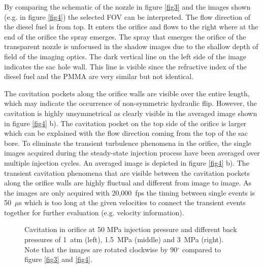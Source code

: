 \documentclass[letterpaper,twocolumn,10pt]{ilass}
\begin{document}
By comparing the schematic of the nozzle in figure \ref{fig3} and the images shown
(e.g. in figure \ref{fig4}) the selected FOV can be interpreted. The flow direction of the
diesel fuel is from top. It enters the orifice and flows to the right where at the end of the
orifice the spray emerges.\newline
The spray that emerges the orifice of the transparent nozzle is unfocused in the shadow images
due to the shallow depth of field of the imaging optics. The dark vertical line on the left side of the image indicates the sac hole wall.
This line is visible since the refractive index of the diesel fuel and the PMMA are
very similar but not identical.


The cavitation pockets along the orifice walls are visible over the entire length,
which may indicate the occurrence of non-symmetric hydraulic flip.
However, the cavitation is highly unsymmetrical as clearly visible in the averaged image shown
in figure \ref{fig4} b). The cavitation pocket on the top side of the orifice is larger which
can be explained with the flow direction coming from the top of the sac bore.\newline
To eliminate the transient turbulence phenomena in the orifice, the single images
acquired during the steady-state injection process have been averaged over multiple injection cycles. An averaged image is depicted in figure \ref{fig4} b).
%
The transient cavitation phenomena that are visible between the cavitation pockets along the
orifice walls are highly fluctual and different from image to image.  As the images are only
acquired with 20,000~fps the timing between single events is 50~$\mu$s which is too long at
the given velocities to connect the transient events together for further evaluation
(e.g. velocity information).\\
\begin{figure}[h]
\begin{center}
\end{center}
\vspace*{-2mm}
\caption{Cavitation in orifice at 50 MPa injection pressure and different back pressures of
         1~atm (left), 1.5~MPa (middle) and 3~MPa (right). Note that the images are
				 rotated clockwise by 90$^{\circ}$ compared to figure \ref{fig3} and \ref{fig4}.}
\label{fig5} 
\end{figure}
\end{document}
